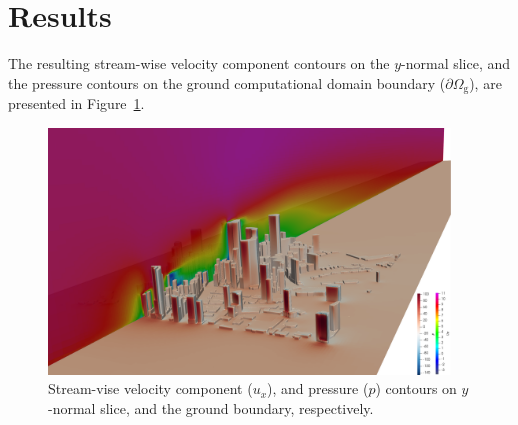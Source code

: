 \cleardoublepage
\section{Results}
\label{sec:exp}

The resulting stream-wise velocity component contours on the $y$-normal slice, and the pressure contours on the ground computational domain boundary ($\partial\Omega_{\mathrm{g}}$), are presented in Figure~\ref{fig:ux_p}.

\begin{figure}[htpb]
    \includegraphics[width=0.95\textwidth]{01_images/res/pUxFront.png}
    \caption{Stream-vise velocity component ($u_x$), and pressure ($p$) contours on $y$-normal slice, and the ground boundary, respectively.}
    \label{fig:ux_p}
\end{figure}